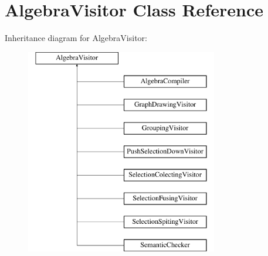 \hypertarget{class_algebra_visitor}{\section{Algebra\+Visitor Class Reference}
\label{class_algebra_visitor}
}
Inheritance diagram for Algebra\+Visitor\+:\begin{figure}[H]
\begin{center}
\leavevmode
\includegraphics[height=9.000000cm]{class_algebra_visitor}
\end{center}
\end{figure}

